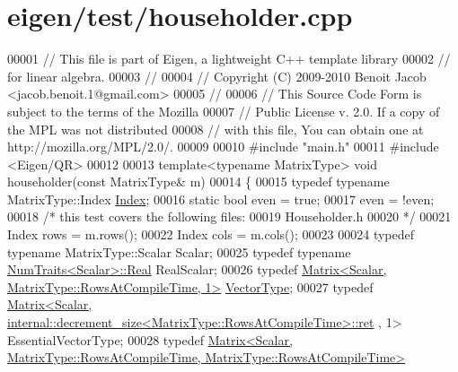 \hypertarget{eigen_2test_2householder_8cpp_source}{}\section{eigen/test/householder.cpp}
\label{eigen_2test_2householder_8cpp_source}

\begin{DoxyCode}
00001 \textcolor{comment}{// This file is part of Eigen, a lightweight C++ template library}
00002 \textcolor{comment}{// for linear algebra.}
00003 \textcolor{comment}{//}
00004 \textcolor{comment}{// Copyright (C) 2009-2010 Benoit Jacob <jacob.benoit.1@gmail.com>}
00005 \textcolor{comment}{//}
00006 \textcolor{comment}{// This Source Code Form is subject to the terms of the Mozilla}
00007 \textcolor{comment}{// Public License v. 2.0. If a copy of the MPL was not distributed}
00008 \textcolor{comment}{// with this file, You can obtain one at http://mozilla.org/MPL/2.0/.}
00009 
00010 \textcolor{preprocessor}{#include "main.h"}
00011 \textcolor{preprocessor}{#include <Eigen/QR>}
00012 
00013 \textcolor{keyword}{template}<\textcolor{keyword}{typename} MatrixType> \textcolor{keywordtype}{void} householder(\textcolor{keyword}{const} MatrixType& m)
00014 \{
00015   \textcolor{keyword}{typedef} \textcolor{keyword}{typename} MatrixType::Index \hyperlink{namespace_eigen_a62e77e0933482dafde8fe197d9a2cfde}{Index};
00016   \textcolor{keyword}{static} \textcolor{keywordtype}{bool} even = \textcolor{keyword}{true};
00017   even = !even;
00018   \textcolor{comment}{/* this test covers the following files:}
00019 \textcolor{comment}{     Householder.h}
00020 \textcolor{comment}{  */}
00021   Index rows = m.rows();
00022   Index cols = m.cols();
00023 
00024   \textcolor{keyword}{typedef} \textcolor{keyword}{typename} MatrixType::Scalar Scalar;
00025   \textcolor{keyword}{typedef} \textcolor{keyword}{typename} \hyperlink{group___core___module_struct_eigen_1_1_num_traits}{NumTraits<Scalar>::Real} RealScalar;
00026   \textcolor{keyword}{typedef} \hyperlink{group___core___module_class_eigen_1_1_matrix}{Matrix<Scalar, MatrixType::RowsAtCompileTime, 1>} 
      \hyperlink{struct_vector_type}{VectorType};
00027   \textcolor{keyword}{typedef} 
      \hyperlink{group___core___module_class_eigen_1_1_matrix}{Matrix<Scalar, internal::decrement\_size<MatrixType::RowsAtCompileTime>::ret}
      , 1> EssentialVectorType;
00028   \textcolor{keyword}{typedef} 
      \hyperlink{group___core___module_class_eigen_1_1_matrix}{Matrix<Scalar, MatrixType::RowsAtCompileTime, MatrixType::RowsAtCompileTime>}

\end{DoxyCode}
